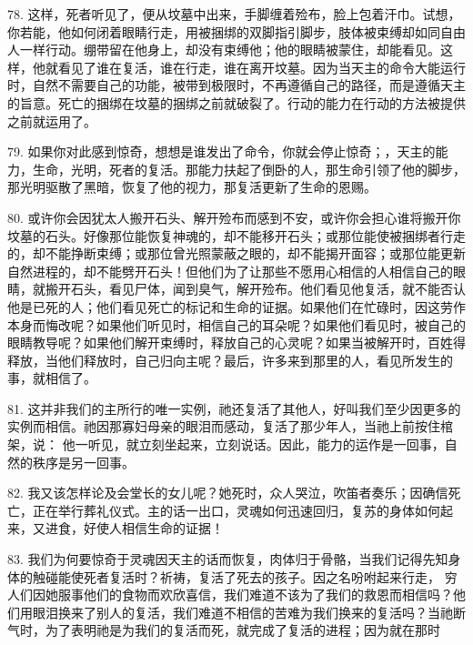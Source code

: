 78. 这样，死者听见了，便从坟墓中出来，手脚缠着殓布，脸上包着汗巾。试想，你若能，他如何闭着眼睛行走，用被捆绑的双脚指引脚步，肢体被束缚却如同自由人一样行动。绷带留在他身上，却没有束缚他；他的眼睛被蒙住，却能看见。这样，他就看见了谁在复活，谁在行走，谁在离开坟墓。因为当天主的命令大能运行时，自然不需要自己的功能，被带到极限时，不再遵循自己的路径，而是遵循天主的旨意。死亡的捆绑在坟墓的捆绑之前就破裂了。行动的能力在行动的方法被提供之前就运用了。\par

79. 如果你对此感到惊奇，想想是谁发出了命令，你就会停止惊奇；，天主的能力，生命，光明，死者的复活。那能力扶起了倒卧的人，那生命引领了他的脚步，那光明驱散了黑暗，恢复了他的视力，那复活更新了生命的恩赐。\par

80. 或许你会因犹太人搬开石头、解开殓布而感到不安，或许你会担心谁将搬开你坟墓的石头。好像那位能恢复神魂的，却不能移开石头；或那位能使被捆绑者行走的，却不能挣断束缚；或那位曾光照蒙蔽之眼的，却不能揭开面容；或那位能更新自然进程的，却不能劈开石头！但他们为了让那些不愿用心相信的人相信自己的眼睛，就搬开石头，看见尸体，闻到臭气，解开殓布。他们看见他复活，就不能否认他是已死的人；他们看见死亡的标记和生命的证据。如果他们在忙碌时，因这劳作本身而悔改呢？如果他们听见时，相信自己的耳朵呢？如果他们看见时，被自己的眼睛教导呢？如果他们解开束缚时，释放自己的心灵呢？如果当被解开时，百姓得释放，当他们释放时，自己归向主呢？最后，许多来到那里的人，看见所发生的事，就相信了。\par

81. 这并非我们的主所行的唯一实例，祂还复活了其他人，好叫我们至少因更多的实例而相信。祂因那寡妇母亲的眼泪而感动，复活了那少年人，当祂上前按住棺架，说： 他一听见，就立刻坐起来，立刻说话。因此，能力的运作是一回事，自然的秩序是另一回事。\par

82. 我又该怎样论及会堂长的女儿呢？她死时，众人哭泣，吹笛者奏乐；因确信死亡，正在举行葬礼仪式。主的话一出口，灵魂如何迅速回归，复苏的身体如何起来，又进食，好使人相信生命的证据！\par

83. 我们为何要惊奇于灵魂因天主的话而恢复，肉体归于骨骼，当我们记得先知身体的触碰能使死者复活时？祈祷，复活了死去的孩子。因之名吩咐起来行走， 穷人们因她服事他们的食物而欢欣喜信，我们难道不该为了我们的救恩而相信吗？他们用眼泪换来了别人的复活，我们难道不相信的苦难为我们换来的复活吗？当祂断气时，为了表明祂是为我们的复活而死，就完成了复活的进程；因为就在那时\par

